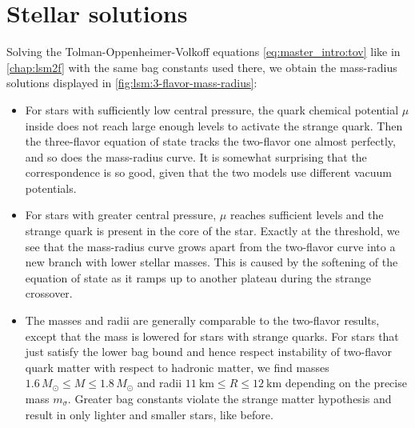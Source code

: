 \section{Stellar solutions}

Solving the Tolman-Oppenheimer-Volkoff equations \eqref{eq:master_intro:tov} like in \cref{chap:lsm2f} with the same bag constants used there,
we obtain the mass-radius solutions displayed in \cref{fig:lsm:3-flavor-mass-radius}:
\begin{itemize}
\item For stars with sufficiently low central pressure,
      the quark chemical potential $\mu$ inside does not reach large enough levels to activate the strange quark.
      Then the three-flavor equation of state tracks the two-flavor one almost perfectly, and so does the mass-radius curve.
      It is somewhat surprising that the correspondence is so good, given that the two models use different vacuum potentials.
\item For stars with greater central pressure, $\mu$ reaches sufficient levels and the strange quark is present in the core of the star.
      Exactly at the threshold, we see that the mass-radius curve grows apart from the two-flavor curve into a new branch with lower stellar masses.
      This is caused by the softening of the equation of state as it ramps up to another plateau during the strange crossover.
\item The masses and radii are generally comparable to the two-flavor results, except that the mass is lowered for stars with strange quarks.
      For stars that just satisfy the lower bag bound and hence respect instability of two-flavor quark matter with respect to hadronic matter,
      we find masses $1.6 \, M_\odot\leq M \leq 1.8 \, M_\odot$ and radii $\SI{11}{\kilo\meter} \leq R \leq \SI{12}{\kilo\meter}$ depending on the precise mass $m_\sigma$.
      Greater bag constants violate the strange matter hypothesis and result in only lighter and smaller stars, like before.
\end{itemize}

